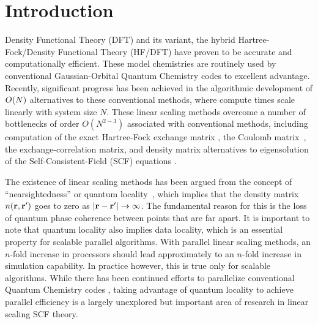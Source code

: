\commentoutA{\documentclass[prb,aps,twocolumn,twocolumngrid]{revtex4}}
\begin{document}
\maketitle

\section{Introduction}
\label{sec:intro}
Density Functional Theory (DFT) and its variant, the hybrid
Hartree-Fock/Density Functional Theory (HF/DFT) have proven to be
accurate and computationally efficient.  These model chemistries are
routinely used by conventional Gaussian-Orbital Quantum Chemistry
codes to excellent advantage.  Recently, significant progress has been
achieved in the algorithmic development of ${\cal }O(N)$ alternatives
to these conventional methods, where compute times scale linearly with
system size $N$\cite{Goedecker99,SWu02}.  These linear scaling methods
overcome a number of bottlenecks of order $O(N^{2-3})$ associated with
conventional methods, including computation of the exact Hartree-Fock
exchange matrix
\cite{ESchwegler96,ESchwegler97,ESchwegler98A,ESchwegler98C,ESchwegler99,ESchwegler00}, 
the Coulomb
matrix~\cite{CWhite94B,CWhite96A,MChallacombe96,MChallacombe96B,MStrain96,MChallacombe97},
the exchange-correlation
matrix\cite{Jorda95,RStratmann96,CGuerra98,MChallacombe00A}, and
density matrix alternatives to eigensolution of the
Self-Consistent-Field (SCF) equations
\cite{XLi93,MDaw93,SQiu94,EHernandez95B,Hernandez96,CMGoringe97,ADaniels97,DBowler99B,APalser99,MChallacombe99,ANiklasson02A,ANiklasson02B}.

The existence of linear scaling methods has been argued from the
concept of ``nearsightedness'' or quantum
locality~\cite{WKohn95,WKohn96}, which implies that the density matrix
$n({\bf r},{\bf r'})$ goes to zero as $|{\bf r}-{\bf r}'| \rightarrow
\infty$. The fundamental reason for this is the loss of quantum phase
coherence between points that are far apart.  It is important to note
that quantum locality also implies data locality, which is an
essential property for scalable parallel algorithms.  With parallel
linear scaling methods, an $n$-fold increase in processors should lead
approximately to an $n$-fold increase in simulation capability.  In
practice however, this is true only for scalable algorithms.  While
there has been continued efforts to parallelize conventional Quantum
Chemistry codes
\cite{Harrison_94v45,Guerra_95,Sosa_98v19,Stephan_98v108,Furlani_00v128,Sosa_00v26,Yoshihiro_01v346,Baker_02v23,HTakashima02},
taking advantage of quantum locality to achieve parallel efficiency is
a largely unexplored but important area of research in linear scaling
SCF theory.
\end{document}
